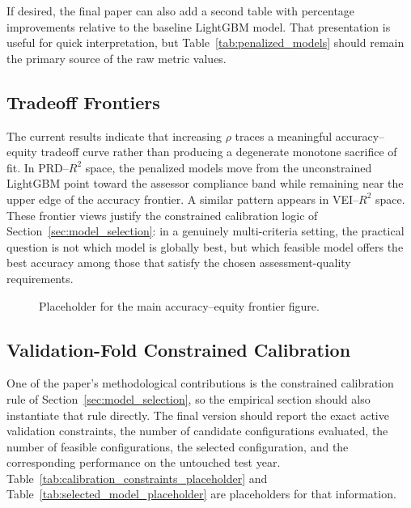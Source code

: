 \documentclass[12pt]{article}
\theoremstyle{plain}
\theoremstyle{definition}
\begin{document}
If desired, the final paper can also add a second table with percentage improvements relative to the baseline LightGBM model. That presentation is useful for quick interpretation, but Table~\ref{tab:penalized_models} should remain the primary source of the raw metric values.

\subsection{Tradeoff Frontiers}

The current results indicate that increasing \(\rho\) traces a meaningful accuracy--equity tradeoff curve rather than producing a degenerate monotone sacrifice of fit. In PRD--\(R^2\) space, the penalized models move from the unconstrained LightGBM point toward the assessor compliance band while remaining near the upper edge of the accuracy frontier. A similar pattern appears in VEI--\(R^2\) space. These frontier views justify the constrained calibration logic of Section~\ref{sec:model_selection}: in a genuinely multi-criteria setting, the practical question is not which model is globally best, but which feasible model offers the best accuracy among those that satisfy the chosen assessment-quality requirements.

\begin{figure}[t]
\centering
{}
\caption{Placeholder for the main accuracy--equity frontier figure.}
\label{fig:frontier_placeholder}
\end{figure}





\subsection{Validation-Fold Constrained Calibration}

One of the paper's methodological contributions is the constrained calibration rule of Section~\ref{sec:model_selection}, so the empirical section should also instantiate that rule directly. The final version should report the exact active validation constraints, the number of candidate configurations evaluated, the number of feasible configurations, the selected configuration, and the corresponding performance on the untouched test year. Table~\ref{tab:calibration_constraints_placeholder} and Table~\ref{tab:selected_model_placeholder} are placeholders for that information.
\end{document}

